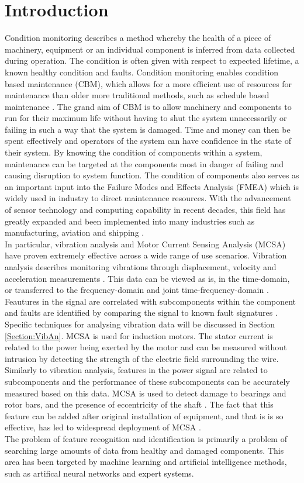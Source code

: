 \documentclass[conference]{IEEEtran}
\begin{document}
\section{Introduction}
Condition monitoring describes a method whereby the health of a piece of machinery, equipment or an individual component is inferred from data collected during operation. The condition is often given with respect to expected lifetime, a known healthy condition and faults. Condition monitoring enables condition based maintenance (CBM), which allows for a more efficient use of resources for maintenance than older more traditional methods, such as schedule based maintenance \cite{CardenFanning}\cite{ArmyTrucks}. The grand aim of CBM is to allow machinery and components to run for their maximum life without having to shut the system unnecessarily or failing in such a way that the system is damaged. Time and money can then be spent effectively and operators of the system can have confidence in the state of their system. By knowing the condition of components within a system, maintenance can be targeted at the components most in danger of failing and causing disruption to system function. The condition of components also serves as an important input into the Failure Modes and Effects Analysis (FMEA) which is widely used in industry to direct maintenance resources. With the advancement of sensor technology and computing capability in recent decades, this field has greatly expanded and been implemented into many industries such as manufacturing, aviation and shipping \cite{Vibration Book}.\\
In particular, vibration analysis and Motor Current Sensing Analysis (MCSA) have proven extremely effective across a wide range of use scenarios. Vibration analysis describes monitoring vibrations through displacement, velocity and acceleration measurements \cite{CardenFanning}. This data can be viewed as is, in the time-domain, or transferred to the frequency-domain and joint time-frequency-domain \cite{DaiGao}. Feautures in the signal are correlated with subcomponents within the component and faults are identified by comparing the signal to known fault signatures \cite{CardenFanning}. Specific techniques for analysing vibration data will be discussed in Section \ref{Section:VibAn}. MCSA is used for induction motors. The stator current is related to the power being exerted by the motor and can be measured without intrusion by detecting the strength of the electric field surrounding the wire. Similarly to vibration analysis, features in the power signal are related to subcomponents and the performance of these subcomponents can be accurately measured based on this data. MCSA is used to detect damage to bearings and rotor bars, and the presence of eccentricity of the shaft \cite{Wavelets}. The fact that this feature can be added after original installation of equipment, and that is is so effective, has led to widespread deployment of MCSA \cite{Wavelets}.\\
The problem of feature recognition and identification is primarily a problem of searching large amounts of data from healthy and damaged components. This area has been targeted by machine learning and artificial intelligence methods, such as artifical neural networks and expert systems.
\end{document}
